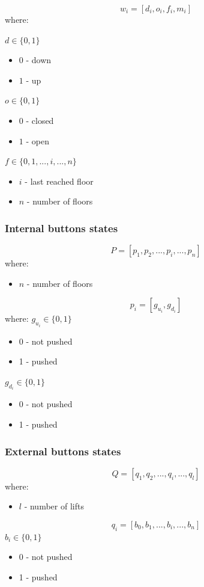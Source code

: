 \documentclass{article}
\begin{document}
\[ w_i = [d_i, o_i, f_i, m_i] \]
where:

\(d \in \{0,1\}\)
\begin{itemize}
  \item \(0\) - down
  \item \(1\) - up
\end{itemize}

\(o \in \{0,1\}\)
\begin{itemize}
  \item \(0\) - closed
  \item \(1\) - open
\end{itemize}

\(f \in \{0,1,...,i,...,n\}\)
\begin{itemize}
  \item \(i\) - last reached floor
  \item \(n\) - number of floors
\end{itemize}

\subsubsection{Internal buttons states}

\[ P = [p_1, p_2, ..., p_i, ..., p_n] \]
where:
\begin{itemize}
  \item \(n\) - number of floors
\end{itemize}

\[ p_i = [g_{u_i}, g_{d_i}] \]
where:
\(g_{u_i} \in \{0,1\}\)
\begin{itemize}
  \item 0 - not pushed
  \item 1 - pushed
\end{itemize}
\(g_{d_i} \in \{0,1\}\)
\begin{itemize}
  \item 0 - not pushed
  \item 1 - pushed
\end{itemize}


\subsubsection{External buttons states}
\[ Q = [q_1, q_2, ..., q_i, ..., q_l] \]
where:
\begin{itemize}
  \item \(l\) - number of lifts
\end{itemize}
\[q_i = [b_0, b_1, ..., b_i, ..., b_n] \]
\(b_i \in \{0,1\} \)
\begin{itemize}
  \item 0 - not pushed
  \item 1 - pushed
\end{itemize}
\end{document}
